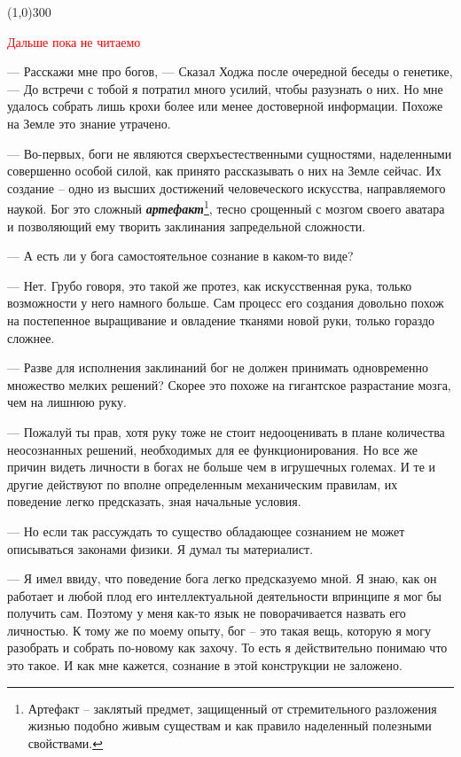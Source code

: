 \documentclass[12pt,a4paper]{article}
\newcommand{\tr}[1]{\textcolor{red}{#1}}
\newcommand{\todo}[1]{\marginpar{\scriptsize \tr{#1}}}
\newcommand{\sep}{
	\begin{center}
		\line(1,0){300}
	\end{center}
}
\begin{document}

\sep


\tr{\Large \center Дальше пока не читаемо}
\newpage

--- Расскажи мне про богов, --- Сказал Ходжа после очередной беседы о генетике, --- До встречи с тобой я потратил много усилий, чтобы разузнать о них. Но мне удалось собрать лишь крохи более или менее достоверной информации. Похоже на Земле это знание утрачено.

--- Во-первых, боги не являются сверхъестественными сущностями, наделенными совершенно особой силой, как принято рассказывать о них на Земле сейчас. Их создание -- одно из высших достижений человеческого искусства, направляемого наукой. Бог это сложный \textbf{\textit{артефакт}}\footnote{Артефакт -- заклятый предмет, защищенный от стремительного разложения жизнью подобно живым существам и как правило наделенный полезными свойствами.}, тесно срощенный с мозгом своего аватара и позволяющий ему творить заклинания запредельной сложности.

--- А есть ли у бога самостоятельное сознание в каком-то виде?

--- Нет. Грубо говоря, это такой же протез, как искусственная рука, только возможности у него намного больше. Сам процесс его создания довольно похож на постепенное выращивание и овладение тканями новой руки, только гораздо сложнее.

--- Разве для исполнения заклинаний бог не должен принимать одновременно множество мелких решений? Скорее это похоже на гигантское разрастание мозга, чем на лишнюю руку.

--- Пожалуй ты прав, хотя руку тоже не стоит недооценивать в плане количества неосознанных решений, необходимых для ее функционирования. Но все же причин видеть личности в богах не больше чем в игрушечных големах. И те и другие действуют по вполне определенным механическим правилам, их поведение легко предсказать, зная начальные условия.

--- Но если так рассуждать то существо обладающее сознанием не может описываться законами физики. Я думал ты материалист.

--- Я имел ввиду, что поведение бога легко предсказуемо мной. Я знаю, как он работает и любой плод его интеллектуальной деятельности впринципе я мог бы получить сам. Поэтому у меня как-то язык не поворачивается назвать его личностью. К тому же по моему опыту, бог -- это такая вещь, которую я могу разобрать и собрать по-новому как захочу. То есть я действительно понимаю что это такое. И как мне кажется, сознание в этой конструкции не заложено.\todo{слишком надменно?}
\end{document}
